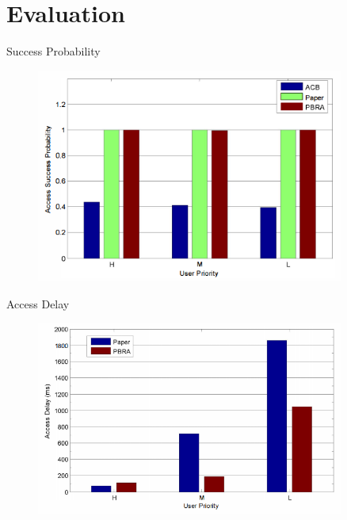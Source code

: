 \documentclass{beamer}
\begin{document}
\section{Evaluation}

\begin{frame} {Success Probability\cite{Zangar16}}
    \begin{figure}[t]
    \centering
    \includegraphics[width=0.9\textwidth]{figures/p3.png}
\end{figure}
\end{frame}
\begin{frame} {Access Delay\cite{Zangar16}}
    \begin{figure}[t]
    \centering
    \includegraphics[width=0.9\textwidth]{figures/p4.png}
\end{figure}
\end{frame}
\end{document}
